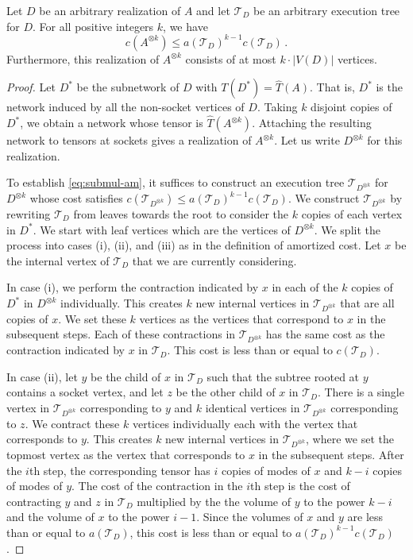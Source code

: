 \documentclass{toc}
\newcommand{\td}{\ensuremath{\mathcal{T}_D}}
\newcommand{\tdk}{\ensuremath{\mathcal{T}_{D^{\otimes k}}}}
\begin{document}
\begin{theorem}
\label{thm:submul-am}
Let $D$ be an arbitrary realization of $A$ and let $\td$ be an arbitrary
execution tree for $D$. For all positive integers $k$, we have
\begin{equation}
\label{eq:submul-am}
c(A^{\otimes k})\leq a(\td)^{k-1} c(\td)\,.
\end{equation}
Furthermore, this realization of $A^{\otimes k}$ consists of
at most $k \cdot |V(D)|$ vertices.
\end{theorem}

\begin{proof}
Let $D^*$ be the subnetwork of $D$ with $T(D^*)=\hat{T}(A)$. That is,
$D^*$ is the network induced by all the non-socket vertices of $D$.
Taking $k$ disjoint copies of $D^*$, we obtain a network whose tensor is $\hat{T}(A^{\otimes k})$. Attaching the resulting network
to tensors at sockets gives a realization of $A^{\otimes k}$.
Let us write $D^{\otimes k}$ for this realization.

To establish \eqref{eq:submul-am}, it suffices to construct an execution
tree $\tdk$ for $D^{\otimes k}$ whose cost satisfies
$c(\tdk)\leq a(\td)^{k-1} c(\td)$. We construct $\tdk$
by rewriting $\td$ from leaves towards the root
to consider the $k$ copies of each vertex in $D^*$. We start with leaf vertices which are the vertices of $D^{\otimes k}$.
We split the process into cases (i), (ii), and (iii)
as in the definition of amortized cost.
Let $x$ be the internal vertex of $\td$ that we are currently considering.

In case (i), we perform the contraction indicated by $x$ in each of the
$k$ copies of $D^*$ in $D^{\otimes k}$ individually. This creates $k$ new internal vertices
in $\tdk$ that are all copies of $x$.  We set these $k$ vertices as the vertices
that correspond to $x$ in the subsequent steps. Each of these contractions in $\tdk$ has the
same cost as the contraction indicated by $x$ in $\td$. This cost is less than or equal to $c(\td)$.

In case (ii), let $y$ be the child of $x$ in $\td$ such that the subtree rooted at $y$ contains a socket vertex, and
let $z$ be the other child of $x$ in $\td$.
There is a single vertex in
$\tdk$ corresponding to $y$ and $k$ identical vertices
in $\tdk$
corresponding to $z$. We contract these $k$ vertices individually each with
the vertex that corresponds to $y$. This creates $k$ new internal vertices
in $\tdk$, where we set the topmost vertex as the vertex that corresponds
to $x$ in the subsequent steps. After the $i$th step, the corresponding tensor has $i$ copies of modes of $x$ and $k-i$ copies of modes of $y$. The cost of the  contraction in the $i$th step is the cost of contracting $y$ and $z$ in $\td$ multiplied by the the volume of $y$ to the power $k-i$ and the volume of $x$ to the power $i-1$. Since the volumes of $x$ and $y$ are less than or equal to $a(\td)$, this cost is less than or equal to $a(\td)^{k-1}c(\td)$.


\end{proof}
\end{document}
